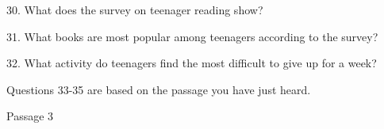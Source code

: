 \documentclass[12pt]{article}
\begin{document}
30. What does the survey on teenager reading show?
\vspace{0.00mm}

\vspace{0.00mm}
\setlength{\parindent}{0.00mm}
\setlength{\leftskip}{-6.23mm}
\setlength{\rightskip}{0.00mm}


\vspace{0.00mm}

\vspace{0.00mm}
\setlength{\parindent}{0.00mm}
\setlength{\leftskip}{-6.23mm}
\setlength{\rightskip}{0.00mm}

31. What books are most popular among teenagers according to the survey?
\vspace{0.00mm}

\vspace{0.00mm}
\setlength{\parindent}{0.00mm}
\setlength{\leftskip}{-6.23mm}
\setlength{\rightskip}{0.00mm}


\vspace{0.00mm}

\vspace{0.00mm}
\setlength{\parindent}{0.00mm}
\setlength{\leftskip}{-6.23mm}
\setlength{\rightskip}{0.00mm}

32. What activity do teenagers find the most difficult to give up for a week?
\vspace{0.00mm}

\vspace{0.00mm}
\setlength{\parindent}{0.00mm}
\setlength{\leftskip}{-6.23mm}
\setlength{\rightskip}{0.00mm}


\vspace{0.00mm}

\vspace{0.00mm}
\setlength{\parindent}{0.00mm}
\setlength{\leftskip}{-6.23mm}
\setlength{\rightskip}{0.00mm}

Questions 33-35 are based on the passage you have just heard.
\vspace{0.00mm}

\vspace{0.00mm}
\setlength{\parindent}{0.00mm}
\setlength{\leftskip}{-6.23mm}
\setlength{\rightskip}{0.00mm}


\vspace{0.00mm}

\vspace{0.00mm}
\setlength{\parindent}{0.00mm}
\setlength{\leftskip}{-6.23mm}
\setlength{\rightskip}{0.00mm}

Passage 3
\vspace{0.00mm}
\end{document}
